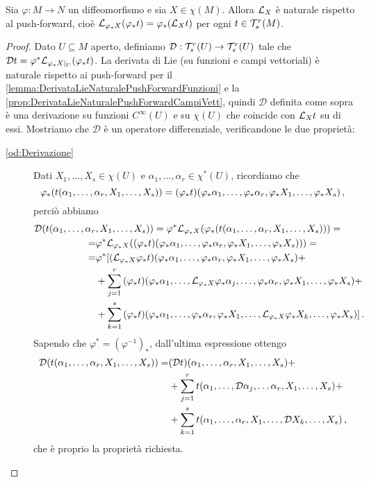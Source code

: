 \begin{proposition}
	Sia $\varphi: M \to N$ un diffeomorfismo e sia $X\in\chi(M)$. Allora $\mathcal L_X$ è naturale rispetto al push-forward, cioè $\mathcal L_{\varphi_*X} (\varphi_*t) = \varphi_*(\mathcal L_Xt)$ per ogni $t\in\mathcal T_s^r(M)$.
\end{proposition}
\begin{proof}
	Dato $U\subseteq M$ aperto, definiamo $\mathcal D: \mathcal T_s^r(U) \to \mathcal T_s^r(U)$ tale che $\mathcal Dt = \varphi^*\mathcal L_{\varphi_*X|_ U}(\varphi_*t)$.
	La derivata di Lie (su funzioni e campi vettoriali) è naturale rispetto ai push-forward per il \cref{lemma:DerivataLieNaturalePushForwardFunzioni} e la \cref{prop:DerivataLieNaturalePushForwardCampiVett}, quindi $\mathcal D$ definita come sopra è una derivazione su funzioni $C^\infty(U)$ e su $\chi(U)$ che coincide con $\mathcal L_Xt$ su di essi.
	Mostriamo che $\mathcal D$ è un operatore differenziale, verificandone le due proprietà:
	\begin{description}
	 \item [\ref{od:Derivazione}]
	Dati $X_1,\ldots,X_s\in\chi(U)$ e $\alpha_1,\ldots,\alpha_r\in\chi^*(U)$, ricordiamo che
	\begin{equation*}
	\varphi_*(t(\alpha_1,\ldots,\alpha_r,X_1,\ldots,X_s) )= (\varphi_*t)(\varphi_*\alpha_1,\ldots,\varphi_*\alpha_r,\varphi_*X_1,\ldots,\varphi_*X_s)\, \text{, }
	\end{equation*}
	perciò abbiamo
	\begin{align*}
		\mathcal D(t(\alpha_1,\ldots,\alpha_r&,X_1,\ldots,X_s)) = \varphi^*\mathcal L_{\varphi_*X}(\varphi_*(t(\alpha_1,\ldots,\alpha_r,X_1,\ldots,X_s))) =\\
		=& \varphi^*\mathcal L_{\varphi_*X}((\varphi_*t)(\varphi_*\alpha_1,\ldots,\varphi_*\alpha_r,\varphi_*X_1,\ldots,\varphi_*X_s))) = \\
		=& \varphi^*[(\mathcal L_{\varphi_*X}\varphi_*t)(\varphi_*\alpha_1,\ldots,\varphi_*\alpha_r,\varphi_*X_1,\ldots,\varphi_*X_s) +\\
		&+\sum_{j=1}^r{(\varphi_*t)(\varphi_*\alpha_1,\ldots,\mathcal L_{\varphi_*X}\varphi_*\alpha_j,\ldots,\varphi_*\alpha_r,\varphi_*X_1,\ldots,\varphi_*X_s)} +\\
		&+\sum_{k=1}^s{(\varphi_*t)(\varphi_*\alpha_1,\ldots,\varphi_*\alpha_r,\varphi_*X_1,\ldots,\mathcal L_{\varphi_*X}\varphi_*X_k,\ldots,\varphi_*X_s)}] \, \text{. }
	\end{align*}
	Sapendo che $\varphi^*=(\varphi^{-1})_*$, dall'ultima espressione ottengo
	\begin{align*}
		\mathcal D(t(\alpha_1,\ldots,\alpha_r,X_1,\ldots,X_s)) =& (\mathcal D t)(\alpha_1,\ldots,\alpha_r,X_1,\ldots,X_s)+\\
		&+\sum_{j=1}^r{t(\alpha_1,\ldots,\mathcal D \alpha_j, \ldots \alpha_r,X_1,\ldots,X_s)} +\\
		&+\sum_{k=1}^s{t(\alpha_1,\ldots, \alpha_r,X_1,\ldots,\mathcal D X_k, \ldots,X_s)} \, \text{, }
	\end{align*}
	che è proprio la proprietà richiesta.
	

\end{description}
\end{proof}
